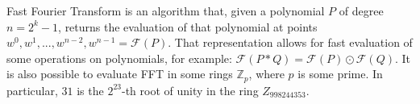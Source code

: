 Fast Fourier Transform is an algorithm that, given a polynomial $P$ of degree $n = 2^k - 1$, returns the evaluation of that polynomial at points $w^0, w^1, ..., w^{n - 2}, w^{n - 1} = \mathcal{F}(P)$. That representation allows for fast evaluation of some operations on polynomials, for example: $\mathcal{F}(P \ast Q) = \mathcal{F}(P) \odot \mathcal{F}(Q)$. It is also possible to evaluate FFT in some rings $\mathbb{Z}_p$, where $p$ is some prime. In particular, $31$ is the $2^{23}$-th root of unity in the ring $Z_{998244353}$.


